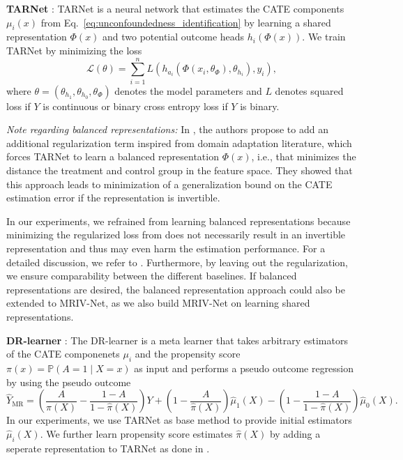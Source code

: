 \documentclass{article} %
\newcommand{\modelname}{\mbox{MRIV-Net}\xspace}
\theoremstyle{definition}
\theoremstyle{plain}
\begin{document}
\textbf{TARNet} \citep{Shalit.2017}:
TARNet \citep{Shalit.2017} is a neural network that estimates the CATE components $\mu_i(x)$ from Eq.~\ref{eq:unconfoundedness_identification} by learning a shared representation $\Phi(x)$ and two potential outcome heads $h_i(\Phi(x))$. We train TARNet by minimizing the loss
\begin{equation}
    \mathcal{L}(\theta) = \sum_{i=1}^n L\left(h_{a_i}(\Phi(x_i, \theta_\Phi), \theta_{h_i}), y_i \right),
\end{equation}
where $\theta = (\theta_{h_1}, \theta_{h_0}, \theta_\Phi)$ denotes the model parameters and $L$ denotes squared loss if $Y$ is continuous or binary cross entropy loss if $Y$ is binary.

\emph{Note regarding balanced representations:} In \citep{Shalit.2017}, the authors propose to add an additional regularization term inspired from domain adaptation literature, which forces TARNet to learn a balanced representation $\Phi(x)$, i.e., that minimizes the distance the treatment and control group in the feature space. They showed that this approach leads to minimization of a generalization bound on the CATE estimation error if the representation is invertible. 

In our experiments, we refrained from learning balanced representations because minimizing the regularized loss from \citep{Shalit.2017} does not necessarily result in an invertible representation and thus may even harm the estimation performance. For a detailed discussion, we refer to \citep{Curth.2021}. Furthermore, by leaving out the regularization, we ensure comparability between the different baselines. If balanced representations are desired, the balanced representation approach could also be extended to \modelname, as we also build \modelname on learning shared representations.

\textbf{DR-learner} \citep{Kennedy.2022d}: The DR-learner \citep{Kennedy.2022d} is a meta learner that takes arbitrary estimators of the CATE componenets $\mu_i$ and the propensity score $\pi(x) = \mathbb{P}(A = 1 \mid X = x)$ as input and performs a pseudo outcome regression by using the pseudo outcome
\begin{equation}
    \hat{Y}_{\mathrm{MR}} = \left(\frac{A}{\hat{\pi}(X)} - \frac{1-A}{1-\hat{\pi}(X)}\right)Y + \left(1 - \frac{A}{\hat{\pi}(X)}\right)\hat{\mu}_1(X) - \left(1 - \frac{1 - A}{1 - \hat{\pi}(X)} \right)\hat{\mu}_0(X) .
\end{equation}
In our experiments, we use TARNet as base method to provide initial estimators $\hat{\mu}_i(X)$. We further learn propensity score estimates $\hat{\pi}(X)$ by adding a seperate representation to TARNet as done in \citep{Shalit.2017}.
\end{document}
